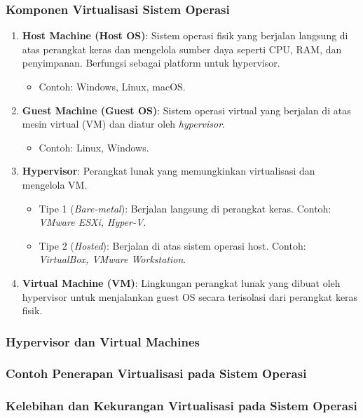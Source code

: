 \documentclass[12pt]{article}
\begin{document}
\subsubsection{Komponen Virtualisasi Sistem Operasi}
\begin{enumerate}
    \item \textbf{Host Machine (Host OS)}:
        Sistem operasi fisik yang berjalan langsung di atas perangkat keras dan mengelola sumber daya seperti CPU, RAM, dan penyimpanan. Berfungsi sebagai platform untuk hypervisor.
    \begin{itemize}
        \item Contoh: Windows, Linux, macOS.
    \end{itemize}
    
    \item \textbf{Guest Machine (Guest OS)}:
        Sistem operasi virtual yang berjalan di atas mesin virtual (VM) dan diatur oleh \textit{hypervisor}. 
    \begin{itemize}
        \item Contoh: Linux, Windows.
    \end{itemize}
    
    \item \textbf{Hypervisor}:
    Perangkat lunak yang memungkinkan virtualisasi dan mengelola VM.
    \begin{itemize}
        \item Tipe 1 (\textit{Bare-metal}): Berjalan langsung di perangkat keras. Contoh: \textit{VMware ESXi, Hyper-V}.
        \item Tipe 2 (\textit{Hosted}): Berjalan di atas sistem operasi host. Contoh: \textit{VirtualBox, VMware Workstation}.
    \end{itemize}
    
    \item \textbf{Virtual Machine (VM)}:
    Lingkungan perangkat lunak yang dibuat oleh hypervisor untuk menjalankan guest OS secara terisolasi dari perangkat keras fisik.
\end{enumerate}

\subsubsection{Hypervisor dan Virtual Machines}
\subsubsection{Contoh Penerapan Virtualisasi pada Sistem Operasi}
\subsubsection{Kelebihan dan Kekurangan Virtualisasi pada Sistem Operasi}
\end{document}
